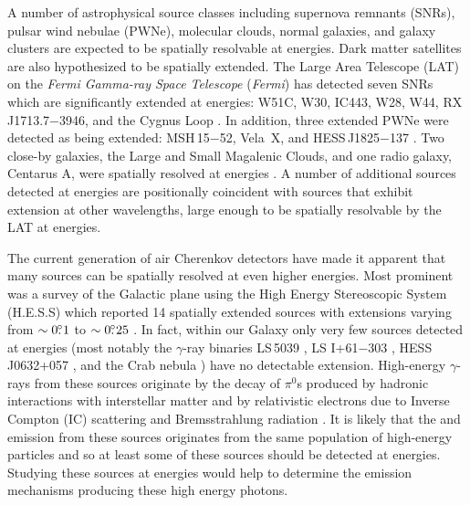 \documentclass[12pt,preprint]{aastex}
\newcommand{\gev}{\text{GeV}\xspace}
\newcommand{\tev}{\text{TeV}\xspace}
\newcommand{\fermi}{\textit{Fermi}\xspace}
\newcommand{\hl}[1]{#1}
\begin{document}
\hl{

A number of astrophysical source classes including supernova remnants
(SNRs), pulsar wind nebulae (PWNe), molecular clouds, normal galaxies,
and galaxy clusters are expected to be spatially resolvable at
\gev energies.  Dark matter satellites are also hypothesized to
be spatially extended.  The Large Area Telescope
(LAT) on the {\em \fermi Gamma-ray Space Telescope} (\fermi) has
detected seven SNRs which are significantly extended
at \gev energies: 
W51C, W30, 
IC443, W28, W44, RX\,J1713.7$-$3946,
and the Cygnus Loop
\citep{w51c,castro_and_slane_2010,ic443,w28,w44,rx_j1713_lat,cygnus_loop_lat}. In addition, three extended
PWNe were detected as being extended: MSH\,15$-$52, Vela~X, and
HESS\,J1825$-$137 \citep{msh1552,velax,fermi_hess_j1825}. Two
close-by galaxies, the Large and Small Magalenic Clouds, and one
radio galaxy, Centarus A, were spatially resolved at \gev energies
\citep{lmc,smc,cen_a_lat}.  A number of additional sources detected
at \gev energies are positionally coincident with sources that exhibit
extension at other wavelengths, large enough to be spatially
resolvable by the LAT at \gev energies.

The current generation of air Cherenkov detectors have
made it apparent that many sources can be spatially resolved
at even higher energies.
Most
prominent was a survey of the Galactic plane using the High Energy
Stereoscopic System (H.E.S.S) which reported 14 spatially extended
sources with extensions varying from $\sim0\mbox{$.\!\!^\circ$}1$ to $\sim0\mbox{$.\!\!^\circ$}25$
\citep{hess_plane_survey}.  In fact, within our Galaxy only very few
sources detected at \tev energies (most notably the $\gamma$-ray binaries
LS\,5039 \citep{HESSLS5039}, LS I+61$-$303 \citep{MAGICLSI, VERITASLSI},
HESS\,J0632+057 \citep{HESS0632}, and the Crab nebula \citep{crab_weekes})
have no detectable extension.  High-energy $\gamma$-rays from
these sources originate by the decay of $\pi^0$s produced by hadronic
interactions with interstellar matter and by relativistic electrons
due to Inverse Compton (IC) scattering and Bremsstrahlung radiation
\citep{blandford_and_eichler_1987}.  It is likely that the \gev and
\tev emission from these sources originates from the same population of
high-energy particles and so at least some of these sources should be
detected at \gev energies.  Studying 
these \tev sources at \gev energies would help to
determine the emission mechanisms producing these high energy photons.

}
\end{document}
